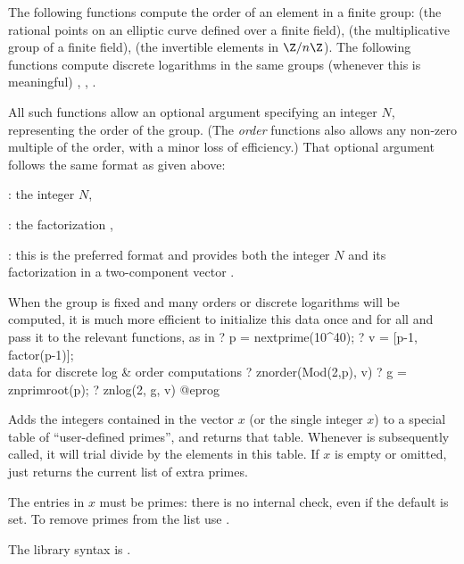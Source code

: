 \label{se:DLfun}

The following functions compute the order of an element in a finite group:
 (the rational points on an elliptic curve defined over a
finite field),  (the multiplicative group of a finite field),
 (the invertible elements in $\Z/n\Z$). The following functions
compute discrete logarithms in the same groups (whenever this is meaningful)
, , .

All such functions allow an optional argument specifying an integer
$N$, representing the order of the group. (The \emph{order} functions also
allows any non-zero multiple of the order, with a minor loss of efficiency.)
That optional argument follows the same format as given above:

\item {}: the integer $N$,

\item {}: the factorization ,

\item {}: this is the preferred format and provides both the
integer $N$ and its factorization in a two-component vector
\kbd{[$N$, fa]}.

When the group is fixed and many orders or discrete logarithms will be
computed, it is much more efficient to initialize this data once and for all
and pass it to the relevant functions, as in
\bprog
? p = nextprime(10^40);
? v = [p-1, factor(p-1)]; \\ data for discrete log & order computations
? znorder(Mod(2,p), v)
? g = znprimroot(p);
? znlog(2, g, v)
@eprog
\bigskip


\label{se:addprimes}
Adds the integers contained in the
vector $x$ (or the single integer $x$) to a special table of
``user-defined primes'', and returns that table. Whenever  is
subsequently called, it will trial divide by the elements in this table.
If $x$ is empty or omitted, just returns the current list of extra
primes.

The entries in $x$ must be primes: there is no internal check, even if
the  default is set. To remove primes from the list use
.

The library syntax is .

